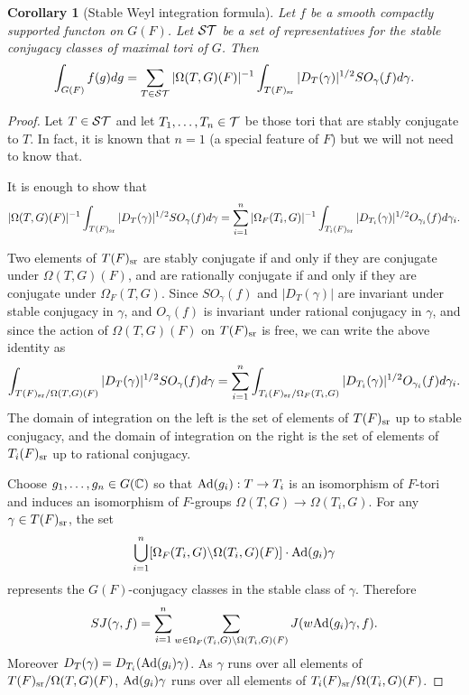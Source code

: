 \documentclass{article}
\newtheorem{cor}[thm]{Corollary}
\theoremstyle{definition}
\numberwithin{equation}{section}
\renewcommand{\-}{\hyp{}}
\begin{document}
\begin{cor}[Stable Weyl integration formula] \label{cor:stabweyl}
	Let $f$ be a smooth compactly supported functon on $G(F)$. Let $\mathcal{ST}$ be a set of representatives for the stable conjugacy classes of maximal tori of $G$.
	Then
	\[ \int_{G(F)}f(g)dg = \sum_{T \in \mathcal{ST}}|\Omega(T,G)(F)|^{-1}\int_{T(F)_{\textrm{sr}}} |D_T(\gamma)|^{1/2}SO_\gamma(f)d\gamma. \]
\end{cor}
\begin{proof}
	Let $T \in \mathcal{ST}$ and let $T_1,\dots,T_n \in \mathcal{T}$ be those tori that  are stably conjugate to $T$. In fact, it is known that $n=1$ (a special feature of $F$) but we will not need to know that.
	
	It is enough to show that 
	\[ |\Omega(T,G)(F)|^{-1}\int_{T(F)_{\textrm{sr}}} |D_T(\gamma)|^{1/2}SO_\gamma(f)d\gamma = \sum_{i=1}^n|\Omega_F(T_i,G)|^{-1}\int_{T_i(F)_{\textrm{sr}}} |D_{T_i}(\gamma)|^{1/2}O_{\gamma_i}(f)d\gamma_i. \]
	
	Two elements of $T(F)_{\textrm{sr}}$ are stably conjugate if and only if they are conjugate under $\Omega(T,G)(F)$, and are rationally conjugate if and only if they are conjugate under $\Omega_F(T,G)$. Since $SO_\gamma(f)$ and $|D_T(\gamma)|$ are invariant under stable conjugacy in $\gamma$, and $O_\gamma(f)$ is invariant under rational conjugacy in $\gamma$, and since the action of $\Omega(T,G)(F)$ on $T(F)_{\textrm{sr}}$ is free,  we can write the above identity as 
	\[ \int_{T(F)_{\textrm{sr}}/\Omega(T,G)(F)} |D_{T}(\gamma)|^{1/2} SO_\gamma(f)d\gamma = \sum_{i=1}^n\int_{T_i(F)_{\textrm{sr}}/\Omega_F(T_i,G)} |D_{T_i}(\gamma)|^{1/2}O_{\gamma_i}(f)d\gamma_i. \]
	The domain of integration on the left is the set of elements of $T(F)_{\textrm{sr}}$ up to stable conjugacy, and the domain of integration on the right is the set of elements of $T_i(F)_{\textrm{sr}}$ up to rational conjugacy.

	Choose $g_1,\dots,g_n \in G(\mathbb{C})$ so that $\textrm{Ad}(g_i) : T \to T_i$ is an isomorphism of $F$-tori and induces an isomorphism of $F$-groups $\Omega(T,G) \to \Omega(T_i,G)$. For any $\gamma \in T(F)_{\textrm{sr}}$, the set 
	\[ \bigcup_{i=1}^n [\Omega_F(T_i,G) \backslash \Omega(T_i,G)(F)] \cdot \textrm{Ad}(g_i)\gamma \]
	represents the $G(F)$-conjugacy classes in the stable class of $\gamma$. Therefore 
	\[ SJ(\gamma,f) = \sum_{i=1}^n \sum_{w \in \Omega_F(T_i,G) \backslash \Omega(T_i,G)(F)} J(w\textrm{Ad}(g_i)\gamma,f).\]
	Moreover $D_T(\gamma)=D_{T_i}(\textrm{Ad}(g_i)\gamma)$.
	As $\gamma$ runs over all elements of $T(F)_{\textrm{sr}}/\Omega(T,G)(F)$, $\textrm{Ad}(g_i)\gamma$ runs over all elements of $T_i(F)_{\textrm{sr}}/\Omega(T_i,G)(F)$.
\end{proof}
\end{document}
